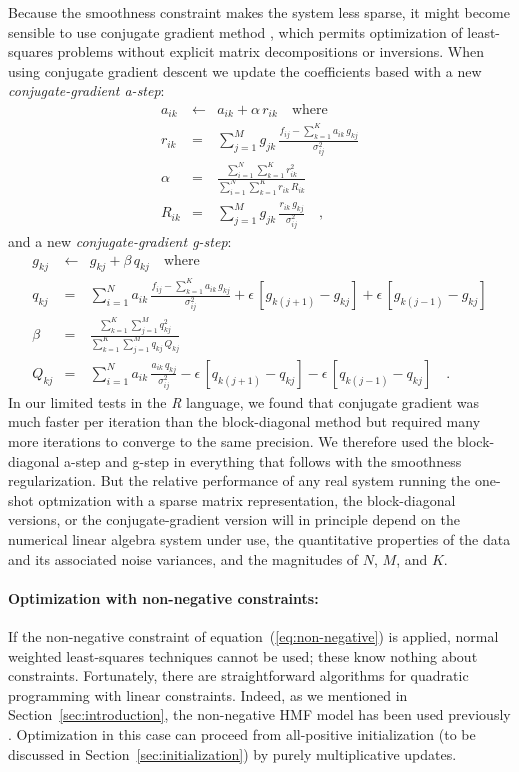 \documentclass[12pt,preprint]{aastex}
\newcommand{\project}[1]{\textsl{#1}}
\newcommand{\sectionname}{Section}
\newcommand{\equationname}{equation}
\begin{document}
Because the smoothness constraint makes the system less sparse, it
might become sensible to use conjugate gradient method \citep[for
  example,][]{shewchuk}, which permits optimization of least-squares
problems without explicit matrix decompositions or inversions.  When
using conjugate gradient descent we update the coefficients based with
a new \emph{conjugate-gradient a-step}:
\begin{eqnarray}\label{eq:astep_conj}\displaystyle
a_{ik} & \gets & a_{ik}+\alpha\,r_{ik} \quad \mbox{where} \nonumber\\
r_{ik} & = & \sum_{j=1}^{M}g_{jk}\,\frac{f_{ij}-\sum_{k=1}^{K}a_{ik}\,g_{kj}}{\sigma^2_{ij}} \nonumber\\
\alpha & = & \frac{\sum_{i=1}^{N}\sum_{k=1}^{K}r^2_{ik}}{\sum_{i=1}^{N}\sum_{k=1}^{K}r_{ik}\,R_{ik}} \nonumber\\
R_{ik} & = & \sum_{j=1}^{M}g_{jk}\,\frac{r_{ik}\,g_{kj}}{\sigma^2_{ij}}
\quad ,
\end{eqnarray}
and a new \emph{conjugate-gradient g-step}:
\begin{eqnarray}\label{eq:gstep_conj}\displaystyle
g_{kj} & \gets & g_{kj}+\beta\,q_{kj} \quad \mbox{where} \nonumber\\
q_{kj} & = & \sum_{i=1}^{N}a_{ik}\,\frac{f_{ij}-\sum_{k=1}^{K}a_{ik}\,g_{kj}}{\sigma^2_{ij}}+\epsilon\,[g_{k(j+1)}-g_{kj}]+\epsilon\,[g_{k(j-1)}-g_{kj}] \nonumber\\
\beta & = & \frac{\sum_{k=1}^{K}\sum_{j=1}^{M}q^2_{kj}}{\sum_{k=1}^{K}\sum_{j=1}^{M}q_{kj}\,Q_{kj}} \nonumber\\
Q_{kj} & = & \sum_{i=1}^{N}a_{ik}\,\frac{a_{ik}\,q_{kj}}{\sigma^2_{ij}}-\epsilon\,[q_{k(j+1)}-q_{kj}]-\epsilon\,[q_{k(j-1)}-q_{kj}]
\quad .
\end{eqnarray}
In our limited tests in the \project{R} language, we found that
conjugate gradient was much faster per iteration than the
block-diagonal method but required many more iterations to converge to
the same precision.  We therefore used the block-diagonal a-step and
g-step in everything that follows with the smoothness regularization.
But the relative performance of any real system running the one-shot
optmization with a sparse matrix representation, the block-diagonal
versions, or the conjugate-gradient version will in principle depend
on the numerical linear algebra system under use, the quantitative
properties of the data and its associated noise variances, and the
magnitudes of $N$, $M$, and $K$.

\paragraph{Optimization with non-negative constraints:}
If the non-negative constraint of
\equationname~(\ref{eq:non-negative}) is applied, normal weighted
least-squares techniques cannot be used; these know nothing about
constraints.  Fortunately, there are straightforward algorithms for
quadratic programming with linear constraints.  Indeed, as we
mentioned in \sectionname~\ref{sec:introduction}, the non-negative HMF
model has been used previously \citep{blanton}.  Optimization in this
case can proceed from all-positive initialization (to be discussed in
\sectionname~\ref{sec:initialization}) by purely multiplicative
updates.
\end{document}

